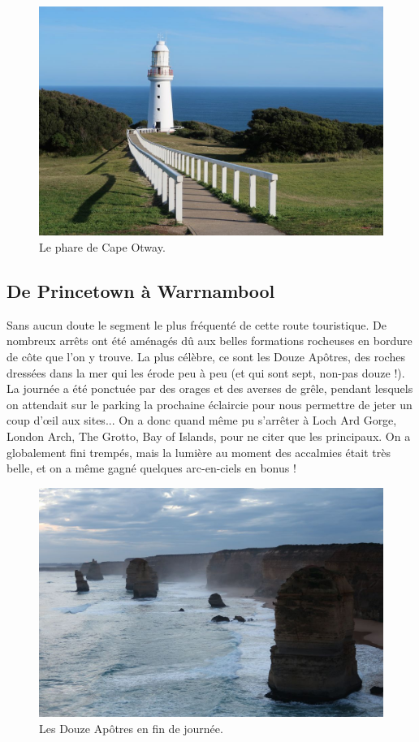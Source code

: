 \begin{figure}
\centering
\includegraphics{images/20180731_capeotway.JPG}
\caption{Le phare de Cape Otway.}
\end{figure}

\hypertarget{de-princetown-uxe0-warrnambool}{%
\subsection{De Princetown à
Warrnambool}\label{de-princetown-uxe0-warrnambool}}

Sans aucun doute le segment le plus fréquenté de cette route
touristique. De nombreux arrêts ont été aménagés dû aux belles
formations rocheuses en bordure de côte que l'on y trouve. La plus
célèbre, ce sont les Douze Apôtres, des roches dressées dans la mer qui
les érode peu à peu (et qui sont sept, non-pas douze !). La journée a
été ponctuée par des orages et des averses de grêle, pendant lesquels on
attendait sur le parking la prochaine éclaircie pour nous permettre de
jeter un coup d'œil aux sites... On a donc quand même pu s'arrêter à
Loch Ard Gorge, London Arch, The Grotto, Bay of Islands, pour ne citer
que les principaux. On a globalement fini trempés, mais la lumière au
moment des accalmies était très belle, et on a même gagné quelques
arc-en-ciels en bonus !

\begin{figure}
\centering
\includegraphics{images/20180731_douzeapotres.JPG}
\caption{Les Douze Apôtres en fin de journée.}
\end{figure}

